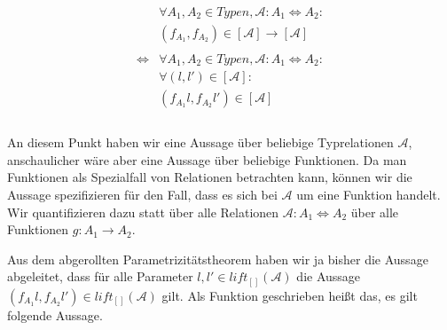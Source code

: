 \begin{align*}
&\forall A_1, A_2 \in Typen, \mathcal{A} : A_1 \Leftrightarrow A_2: \\
&(f_{A_1}, f_{A_2}) \in [\mathcal{A}] \rightarrow [\mathcal{A}] \\
& \\
\Leftrightarrow &
\forall A_1, A_2 \in Typen, \mathcal{A} : A_1 \Leftrightarrow A_2: \\
& \forall (l, l') \in [\mathcal{A}]: \\
&(f_{A_1} l, f_{A_2} l') \in [\mathcal{A}] \\
& \\
\end{align*}


An diesem Punkt haben wir eine Aussage über beliebige Typrelationen $\mathcal{A}$, anschaulicher wäre aber eine Aussage
über beliebige Funktionen. Da man Funktionen als Spezialfall von Relationen betrachten kann, können wir die Aussage
spezifizieren für den Fall, dass es sich bei $\mathcal{A}$ um eine Funktion handelt. Wir quantifizieren dazu statt
über alle Relationen $\mathcal{A} : A_1 \Leftrightarrow A_2$ über alle Funktionen $g : A_1 \rightarrow A_2$.

Aus dem abgerollten Parametrizitätstheorem haben wir ja bisher die Aussage abgeleitet, dass für alle Parameter $l, l' \in lift_{[]}(\mathcal{A})$
die Aussage $(f_{A_1} l, f_{A_2} l') \in lift_{[]}(\mathcal{A})$ gilt. Als Funktion geschrieben heißt das, es gilt folgende Aussage.

